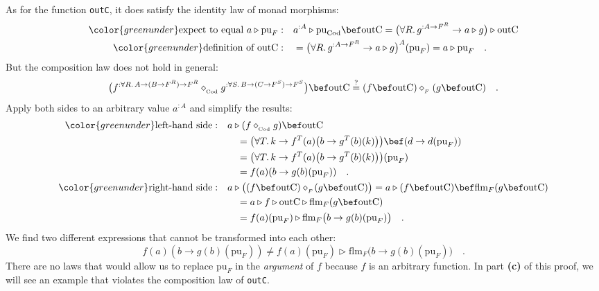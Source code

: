 As for the function \lstinline!outC!, it does satisfy the identity
law of monad morphisms:
\begin{align*}
{\color{greenunder}\text{expect to equal }a\triangleright\text{pu}_{F}:}\quad & a^{:A}\triangleright\text{pu}_{\text{Cod}}\bef\text{outC}=\big(\forall R.\,g^{:A\rightarrow F^{R}}\rightarrow a\triangleright g\big)\triangleright\text{outC}\\
{\color{greenunder}\text{definition of }\text{outC}:}\quad & =\big(\forall R.\,g^{:A\rightarrow F^{R}}\rightarrow a\triangleright g\big)^{A}(\text{pu}_{F})=a\triangleright\text{pu}_{F}\quad.
\end{align*}
But the composition law does not hold in general:
\[
\big(f^{:\forall R.\,A\rightarrow(B\rightarrow F^{R})\rightarrow F^{R}}\diamond_{_{\text{Cod}}}g^{:\forall S.\,B\rightarrow(C\rightarrow F^{S})\rightarrow F^{S}}\big)\bef\text{outC}\overset{?}{=}(f\bef\text{outC})\diamond_{_{F}}(g\bef\text{outC})\quad.
\]
Apply both sides to an arbitrary value $a^{:A}$ and simplify the
results:
\begin{align*}
{\color{greenunder}\text{left-hand side}:}\quad & a\triangleright(f\diamond_{_{\text{Cod}}}g)\bef\text{outC}\\
 & \quad=\big(\forall T.\,k\rightarrow f^{T}(a)\big(b\rightarrow g^{T}(b)(k)\big)\big)\bef(d\rightarrow d(\text{pu}_{F}))\\
 & \quad=\big(\forall T.\,k\rightarrow f^{T}(a)\big(b\rightarrow g^{T}(b)(k)\big)\big)(\text{pu}_{F})\\
 & \quad=f(a)(b\rightarrow g(b)(\text{pu}_{F}))\quad.\\
{\color{greenunder}\text{right-hand side}:}\quad & a\triangleright\big((f\bef\text{outC})\diamond_{_{F}}\!(g\bef\text{outC})\big)=a\triangleright(f\bef\text{outC})\bef\text{flm}_{F}(g\bef\text{outC})\\
 & \quad=a\triangleright f\triangleright\text{outC}\triangleright\text{flm}_{F}(g\bef\text{outC})\\
 & \quad=f(a)(\text{pu}_{F})\triangleright\text{flm}_{F}\big(b\rightarrow g(b)(\text{pu}_{F})\big)\quad.
\end{align*}
We find two different expressions that cannot be transformed into
each other:
\[
f(a)(b\rightarrow g(b)(\text{pu}_{F}))\neq f(a)(\text{pu}_{F})\triangleright\text{flm}_{F}\big(b\rightarrow g(b)(\text{pu}_{F})\big)\quad.
\]
There are no laws that would allow us to replace $\text{pu}_{F}$
in the \emph{argument} of $f$ because $f$ is an arbitrary function.
In part \textbf{(c)} of this proof, we will see an example that violates
the composition law of \lstinline!outC!.

